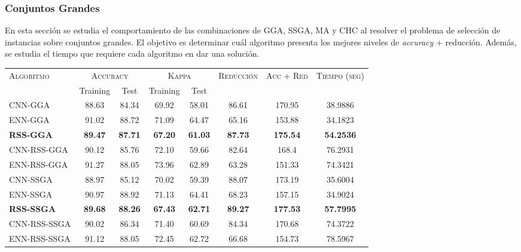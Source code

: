 \subsubsection{Conjuntos Grandes}

En esta sección se estudia el comportamiento de las combinaciones de GGA, SSGA, MA y CHC al resolver el problema de selección de instancias sobre conjuntos grandes. El objetivo es determinar cuál algoritmo presenta los mejores niveles de \emph{accuracy} + reducción. Además, se estudia el tiempo que requiere cada algoritmo en dar una solución.

\begin{table}[h!]
\centering
\begin{adjustbox}{max width =\textwidth}
\begin{tabular}{l c c c c c c c}
\hline
\multirow{2}{*}{\textsc{Algoritmo}}
	& \multicolumn{2}{c}{\textsc{Accuracy}}
	& \multicolumn{2}{c}{\textsc{Kappa}}
	& \textsc{Reducción}
	& \textsc{Acc + Red}
	& \textsc{Tiempo (seg)} \\
	& Training & Test
	& Training & Test \\ 
\hline
\hline

CNN-GGA      & 88.63 & 84.34 & 69.92 & 58.01 & 86.61 & 170.95 & 38.9886 \\
ENN-GGA      & 91.02 & 88.72 & 71.09 & 64.47 & 65.16 & 153.88 & 34.1823 \\
\textbf{RSS-GGA}      & \textbf{89.47} & \textbf{87.71} & \textbf{67.20} & \textbf{61.03} & \textbf{87.73} & \textbf{175.54} & \textbf{54.2536} \\
CNN-RSS-GGA  & 90.12 & 85.76 & 72.10 & 59.66 & 82.64 & 168.4 & 76.2931 \\
ENN-RSS-GGA  & 91.27 & 88.05 & 73.96 & 62.89 & 63.28 & 151.33 & 74.3421 \\

\hline

CNN-SSGA & 88.97 & 85.12 & 70.02 & 59.39 & 88.07 & 173.19 & 35.6004 \\
ENN-SSGA & 90.97 & 88.92 & 71.13 & 64.41 & 68.23 & 157.15 & 34.9024 \\
\textbf{RSS-SSGA} & \textbf{89.68} & \textbf{88.26} & \textbf{67.43} & \textbf{62.71} & \textbf{89.27} & \textbf{177.53} & \textbf{57.7995} \\
CNN-RSS-SSGA & 90.02 & 86.34 & 71.40 & 60.69 & 84.34 & 170.68 & 74.3722 \\
ENN-RSS-SSGA & 91.12 & 88.05 & 72.45 & 62.72 & 66.68 & 154.73 & 78.5967 \\


\end{tabular}
\end{adjustbox}
\end{table}
